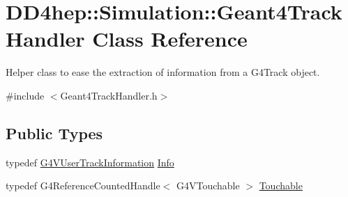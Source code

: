 \hypertarget{class_d_d4hep_1_1_simulation_1_1_geant4_track_handler}{
\section{DD4hep::Simulation::Geant4TrackHandler Class Reference}
\label{class_d_d4hep_1_1_simulation_1_1_geant4_track_handler}
}


Helper class to ease the extraction of information from a G4Track object.  


{\ttfamily \#include $<$Geant4TrackHandler.h$>$}\subsection*{Public Types}
\begin{DoxyCompactItemize}
\item 
typedef \hyperlink{class_g4_v_user_track_information}{G4VUserTrackInformation} \hyperlink{class_d_d4hep_1_1_simulation_1_1_geant4_track_handler_a0db29f37f6c64822f75c656ac27c03b4}{Info}
\item 
typedef G4ReferenceCountedHandle$<$ G4VTouchable $>$ \hyperlink{class_d_d4hep_1_1_simulation_1_1_geant4_track_handler_a7db438397a8ccd838ba7bf5fe1b75bdb}{Touchable}
\end{DoxyCompactItemize}
